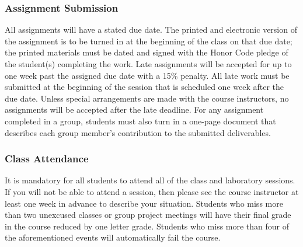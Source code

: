 \vspace{-.3in}
\subsubsection*{Assignment Submission}

All assignments will have a stated due date. The printed and electronic version of the assignment is to be turned in at
the beginning of the class on that due date; the printed materials must be dated and signed with the Honor Code pledge
of the student(s) completing the work.  Late assignments will be accepted for up to one week past the assigned due date
with a 15\% penalty. All late work must be submitted at the beginning of the session that is scheduled one week
after the due date. Unless special arrangements are made with the course instructors, no assignments will be accepted
after the late deadline. For any assignment completed in a group, students must also turn in a one-page document that
describes each group member's contribution to the submitted deliverables.


\vspace{-.20in}
\subsubsection*{Class Attendance}


It is mandatory for all students to attend all of the class and laboratory sessions. If you will not be able to attend a
session, then please see the course instructor at least one week in advance to describe your situation.  Students who
miss more than two unexcused classes or group project meetings will have their final grade in the course reduced by one
letter grade. Students who miss more than four of the aforementioned events will automatically fail the course.

